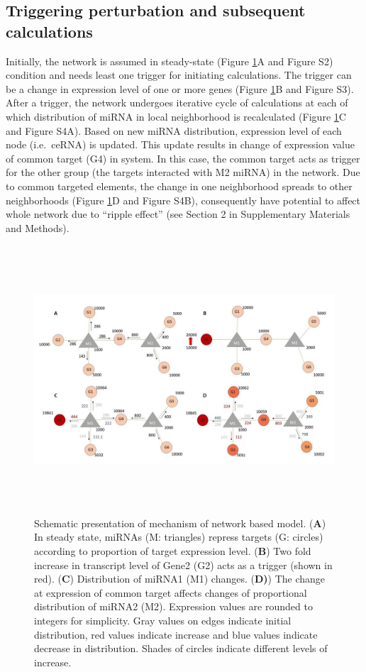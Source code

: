 \documentclass[a4,center,fleqn]{NAR}
\begin{document}
\subsection{Triggering perturbation and subsequent calculations}

Initially, the network is assumed in steady-state (Figure
\ref{fig:fig1}A and Figure S2) condition and needs least one trigger for
initiating calculations. The trigger can be a change in expression level
of one or more genes (Figure \ref{fig:fig1}B and Figure S3). After a
trigger, the network undergoes iterative cycle of calculations at each
of which distribution of miRNA in local neighborhood is recalculated
(Figure \ref{fig:fig1}C and Figure S4A). Based on new miRNA
distribution, expression level of each node (i.e.~ceRNA) is updated.
This update results in change of expression value of common target (G4)
in system. In this case, the common target acts as trigger for the other
group (the targets interacted with M2 miRNA) in the network. Due to
common targeted elements, the change in one neighborhood spreads to
other neighborhoods (Figure \ref{fig:fig1}D and Figure S4B),
consequently have potential to affect whole network due to ``ripple
effect'' (see Section 2 in Supplementary Materials and Methods).

\begin{figure}[ht]
\begin{center}
\includegraphics[width=15cm,height=10cm]{Fig1.jpg}
\end{center}
\caption{Schematic presentation of mechanism of network based model. 
    (\textbf{A}) In steady state, miRNAs (M: triangles) repress targets (G: circles) according to proportion of target expression level. 
    (\textbf{B}) Two fold increase in transcript level of Gene2 (G2) acts as a trigger (shown in red). 
    (\textbf{C}) Distribution of miRNA1 (M1) changes. 
    (\textbf{D)}) The change at expression of common target affects changes of proportional distribution of miRNA2 (M2). Expression values are rounded to integers for simplicity. Gray values on edges indicate initial distribution, red values indicate increase and blue values indicate decrease in distribution. Shades of circles indicate different levels of increase.}
\label{fig:fig1}
\end{figure}
\end{document}
